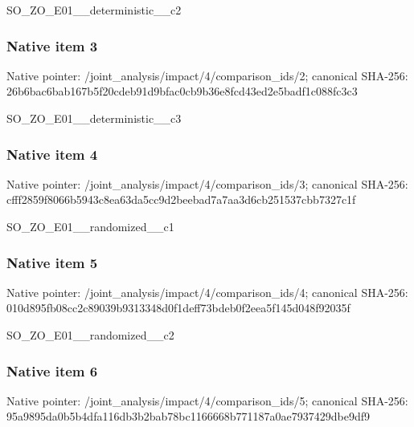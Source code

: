 \documentclass[10pt,a4paper]{article}
\begin{document}
\begingroup\raggedright\sloppy SO\_\allowbreak{}ZO\_\allowbreak{}E01\_\allowbreak{}\_\allowbreak{}deterministic\_\allowbreak{}\_\allowbreak{}c2\par\endgroup

\subsubsection{Native item 3}
Native pointer: /joint\_\allowbreak{}analysis/impact/4/comparison\_\allowbreak{}ids/2; canonical SHA-256: 26b6bac6bab167b5f20cdeb91d9bfac0cb9b36e8fcd43ed2e5badf1c088fc3c3

\begingroup\raggedright\sloppy SO\_\allowbreak{}ZO\_\allowbreak{}E01\_\allowbreak{}\_\allowbreak{}deterministic\_\allowbreak{}\_\allowbreak{}c3\par\endgroup

\subsubsection{Native item 4}
Native pointer: /joint\_\allowbreak{}analysis/impact/4/comparison\_\allowbreak{}ids/3; canonical SHA-256: cfff2859f8066b5943c8ea63da5cc9d2beebad7a7aa3d6cb251537cbb7327c1f

\begingroup\raggedright\sloppy SO\_\allowbreak{}ZO\_\allowbreak{}E01\_\allowbreak{}\_\allowbreak{}randomized\_\allowbreak{}\_\allowbreak{}c1\par\endgroup

\subsubsection{Native item 5}
Native pointer: /joint\_\allowbreak{}analysis/impact/4/comparison\_\allowbreak{}ids/4; canonical SHA-256: 010d895fb08cc2c89039b9313348d0f1deff73bdeb0f2eea5f145d048f92035f

\begingroup\raggedright\sloppy SO\_\allowbreak{}ZO\_\allowbreak{}E01\_\allowbreak{}\_\allowbreak{}randomized\_\allowbreak{}\_\allowbreak{}c2\par\endgroup

\subsubsection{Native item 6}
Native pointer: /joint\_\allowbreak{}analysis/impact/4/comparison\_\allowbreak{}ids/5; canonical SHA-256: 95a9895da0b5b4dfa116db3b2bab78bc1166668b771187a0ae7937429dbe9df9
\end{document}
